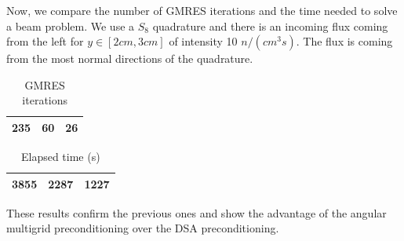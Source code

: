 \documentclass[preprint,10pt]{elsarticle}
\renewcommand{\(}{\left(}
\renewcommand{\)}{\right)}
\renewcommand{\[}{\left[}
\renewcommand{\]}{\right]}
\begin{document}
Now, we compare the number of GMRES iterations and the time needed to solve a
beam problem. We use a $S_8$ quadrature and there is an incoming flux coming
from the left for $y\in [2cm,3cm]$ of intensity 10 $n/(cm^3s)$. The flux is
coming from the most normal directions of the quadrature.
\begin{table}[H]
\begin{center}
\begin{tabular}{|c|c|c|}
\hline
235 & 60 & 26 \\
\hline
\end{tabular}
\caption{GMRES iterations}
\end{center}
\end{table}

\begin{table}[H]
\begin{center}
\begin{tabular}{|c|c|c|}
\hline
3855 & 2287 & 1227\\
\hline
\end{tabular}
\caption{Elapsed time (s)}
\end{center}
\end{table}
These results confirm the previous ones and show the advantage of the angular
multigrid preconditioning over the DSA preconditioning.

\end{document}
